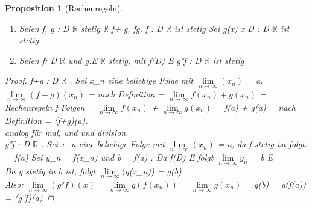 \documentclass[a4paper,titlepage,oneside]{article}
\def\R{\ensuremath{\mathbb{R}} }
\renewcommand{\liminf}[2][n]{\ensuremath{\lim\limits_{#1 \rightarrow \infty}{#2}}}
\theoremstyle{thmstyle}
\newtheorem{prop}[satz]{Proposition}
\begin{document}
\begin{prop}[Rechenregeln]
\begin{enumerate}[label=\alpha*)]
\item Seien f, g : D \to \R stetig  \lambda \in \R
\Rightarrow f+ g, fg, \labda f : D \to \R ist stetig 
Sei g(x)  \forall x \in D \Rightarrow {}: D \to \R ist stetig
\item Seien f: D \to \R und g:E \to \R stetig, mit f(D) \subset E \Rightarrow g°f : D \to \R ist stetig
\end{enumerate}
\begin{proof}
f+g : D \to \R. Sei x_n eine beliebige Folge mit \liminf{(x_n)} = a. 
\liminf{(f+g)(x_n)} = nach Definition = \liminf{f(x_n) + g(x_n)} = Rechenregeln f Folgen = \liminf{f(x_n)} +  \liminf{g(x_n)} = f(a) + g(a) = nach Definition = (f+g)(a). \\ analog für mal, und \lambda und division. %
\\
g°f : D \to \R. Sei x_n eine beliebige Folge mit \liminf{(x_n)} = a, da f stetig ist folgt:  = f(a)
Sei y_n = f(x_n)  und b = f(a) . Da f(D) \subset E folgt \liminf{y_n} = b \in E\\
Da g stetig in b ist, folgt \liminf(g(x_n)) = g(b) \\
Also: \liminf{(g°f)(x)} = \liminf{g(f(x_n))} = \liminf{g(x_n)} = g(b) = g(f(a)) = (g°f)(a)
\end{proof}
\end{prop}
\end{document}

